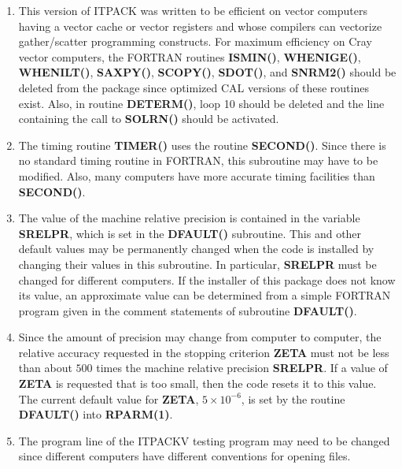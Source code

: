 \begin{enumerate}

 \item This version of ITPACK was written to be efficient on vector
       computers having a vector cache or vector registers and whose
       compilers can vectorize gather/scatter programming constructs.
       For maximum efficiency on Cray vector computers, the FORTRAN
       routines {\bf ISMIN()}, {\bf WHENIGE()}, {\bf WHENILT()},
       {\bf SAXPY()}, {\bf SCOPY()}, {\bf SDOT()}, and {\bf SNRM2()}
       should be deleted from the package since optimized CAL versions
       of these routines exist.  Also, in routine {\bf DETERM()}, loop
       10 should be deleted and the line containing the call to
       {\bf SOLRN()} should be activated.  
 
 \item The timing routine {\bf TIMER()} uses the routine {\bf SECOND()}.
       Since there is no standard timing routine in FORTRAN, this
       subroutine may have to be modified.  Also, many computers have 
       more accurate timing facilities than {\bf SECOND()}.
 
 \item The value of the machine relative precision is contained in the
       variable {\bf SRELPR}, which is set in the {\bf DFAULT()} 
       subroutine.  This and other default values may be permanently 
       changed when the code is installed by changing their values in 
       this subroutine.  In particular, {\bf SRELPR} must be changed for 
       different computers.  If the installer of this package does not 
       know its value, an approximate value can be determined from a 
       simple FORTRAN program given in the comment statements of 
       subroutine {\bf DFAULT()}.
 
 \item Since the amount of precision may change from computer to 
       computer, the relative accuracy requested in the stopping 
       criterion {\bf ZETA} must not be less than about $500$ times 
       the machine relative precision {\bf SRELPR}.  If a value of 
       {\bf ZETA} is requested that is too small, then the code resets 
       it to this value.  The current default value for {\bf ZETA},
       $5 \times 10^{-6}$, is set by the routine {\bf DFAULT()} into 
       {\bf RPARM(1)}.
 
 \item The program line of the ITPACKV testing program may need to
       be changed since  different computers have different conventions 
       for opening files.  

\end{enumerate}

